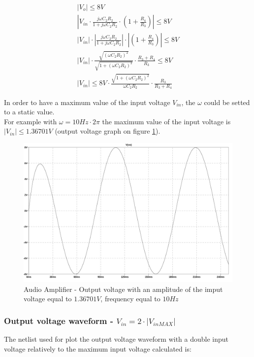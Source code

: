 \documentclass[10pt,a4paper]{article}
\begin{document}
\begin{align}
  |V_o| \leq 8V \nonumber \\
  \left|V_{in}\cdot \frac{j\omega C_2R_2}{1+j\omega C_2R_2} \cdot \left(1 + \frac{R_4}{R_3} \right) \right| \leq 8V \nonumber \\
  |V_{in}|\cdot \left|\frac{j\omega C_2R_2}{1+j\omega C_2R_2} \right| \cdot \left| \left(1 + \frac{R_4}{R_3} \right) \right| \leq 8V \nonumber \\
  |V_{in}|\cdot \frac{\sqrt{(\omega C_2R_2)^2}}{\sqrt{1+(\omega C_2R_2)^2}} \cdot \frac{R_3 + R_4}{R_3} \leq 8V \nonumber \\
  |V_{in}| \leq 8V \cdot \frac{\sqrt{1+(\omega C_2R_2)^2}}{\omega C_2R_2} \cdot \frac{R_3}{R_3 + R_4} \label{eq:V_inSat}
\end{align}

In order to have a maximum value of the input voltage $V_{in}$, the $\omega$ could be setted to a static value.\\
For example with $\omega = 10Hz \cdot 2\pi$ the maximum value of the input voltage is $|V_{in}| \leq 1.36701V$ (output voltage graph on figure \ref{1d4bgraph}).

\begin{figure}[H]
  \centering
  \includegraphics[width=14cm]{graph/1d4b.jpg}
  \caption{Audio Amplifier - Output voltage with an amplitude of the imput voltage equal to $1.36701V$, frequency equal to $10Hz$}
  \label{1d4bgraph}
\end{figure}

\subsubsection{Output voltage waveform - $V_{in} = 2 \cdot |V_{in MAX} |$}
The netlist used for plot the output voltage waveform with a double input voltage relatively to the maximum input voltage calculated is:\\

\end{document}
